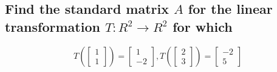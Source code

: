 \documentclass[12pt, a4paper]{article}
\begin{document}
		\subsection{Find the standard matrix $A$ for the linear transformation $T:R^2\rightarrow R^2$ for which}
			$$T(\begin{bmatrix}
					1 \\
					1
				\end{bmatrix})=\begin{bmatrix}
					1 \\
					-2
				\end{bmatrix},T(\begin{bmatrix}
					2 \\
					3
				\end{bmatrix})=\begin{bmatrix}
					-2 \\
					5
				\end{bmatrix}$$
				
\end{document}
